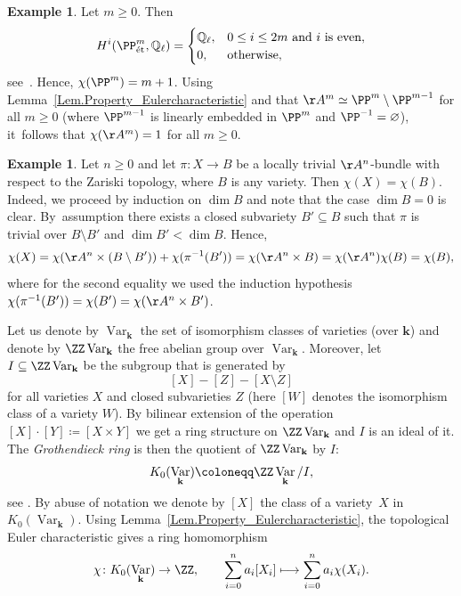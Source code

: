 \documentclass[JEP,XML,SOM,Unicode,NoFloatCountersInSection,published]{cedram}
\newcommand\mto{\mathchoice{\longmapsto}{\mapsto}{\mapsto}{\mapsto}}
\theoremstyle{definition}
\newtheorem{example}[lemma]{Example}
\renewcommand\k{{\mathbf k}}
\newcommand\QQ{{\mathbb Q}}
\newcommand{\kk}{\mathbf{k}}
\DeclareMathOperator{\Var}{Var}
\newcommand{\et}{\textup{ét}}
\begin{document}
\begin{example}\label{Exa:ChiAmPm}
Let $m \geq 0$. Then
\[
H^i(\PP^m_{\et}, \QQ_{\ell}) = 
\begin{cases}
\QQ_{\ell}, & \text{$0 \leq i \leq 2m$ and $i$ is even}, \\
0, & \textrm{otherwise},
\end{cases}
\]
see~\cite[Ex.\,16.3]{Mi2013Lectures-on-Etale-}. Hence,
$\chi(\PP^m) = m+1$. Using Lemma~\ref{Lem.Property_Eulercharacteristic} and that
$\AA^m \simeq \PP^m \setminus \PP^{m-1}$ for all $m \geq 0$
(where $\PP^{m-1}$ is linearly embedded in $\PP^m$ and
$\PP^{-1} = \varnothing$), it~follows that $\chi(\AA^m) = 1$ for all $m \geq 0$.
\end{example}

\begin{example}
\label{Exa.A1bundle}
Let $n \geq 0$ and let $\pi \colon X \to B$ be a locally trivial $\AA^n$-bundle with respect to the Zariski topology, where
$B$ is any variety.
Then $\chi(X) = \chi(B)$. Indeed, we proceed by induction on $\dim B$ and note that the
case $\dim B = 0$ is clear. By~assumption there exists a closed subvariety $B' \subseteq B$
such that $\pi$ is trivial over $B \setminus B'$ and $\dim B' < \dim B$. Hence,
\[
\chi(X) = \chi(\AA^n \times (B \setminus B')) + \chi(\pi^{-1}(B')) = \chi(\AA^n \times B)
= \chi(\AA^n) \chi(B) = \chi(B),
\]
where for the second equality we used the induction hypothesis $\chi(\pi^{-1}(B')) = \chi(B') = \chi(\AA^n \times B')$.
\end{example}

Let us denote by $\Var_\k$ the set of isomorphism classes of varieties (over $\kk$)
and denote by $\ZZ \Var_\k$ the free abelian group over $\Var_\k$. Moreover, let
$I \subseteq \ZZ \Var_\k$ be the subgroup that is generated by
\[
[X] - [Z] - [X \setminus Z]
\]
for all varieties $X$ and closed subvarieties $Z$ (here $[W]$ denotes the isomorphism class of a variety $W$).
By bilinear extension of the operation $[X] \cdot [Y] \coloneqq [X \times Y]$ we get a ring structure on
$\ZZ \Var_\k$ and $I$ is an ideal of it. The \emph{Grothendieck ring} is then the quotient of $\ZZ \Var_\k$ by $I$:
\[
K_0(\Var_\k) \coloneqq \ZZ \Var_\k /I,
\]
see \eg \cite[\S2.2.1]{LiSe2010The-Grothendieck-r}.
By abuse of notation we denote by $[X]$ the class of a variety~$X$ in $K_0(\Var_\k)$.
Using Lemma~\ref{Lem.Property_Eulercharacteristic}, the topological Euler characteristic
gives a ring homomorphism
\[
\chi \colon
K_0(\Var_\k) \to \ZZ,
\qquad \sum_{i=0}^n a_i [X_i] \mto \sum_{i=0}^n a_i \chi(X_i).
\]
\end{document}
